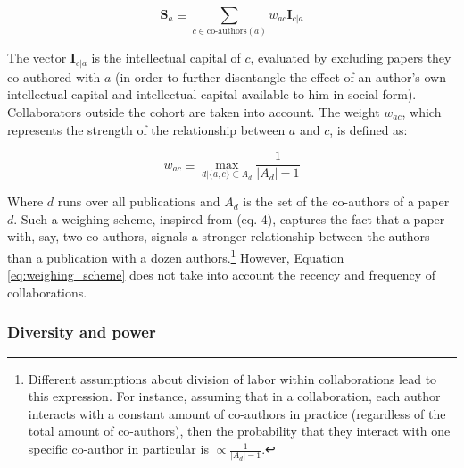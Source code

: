 \documentclass{article}
\begin{document}
\begin{equation}
    \bm{S}_{a} \equiv \sum_{c \in \text{co-authors}(a)} w_{ac} \bm{I}_{c|a}
\end{equation}

The vector $\bm{I}_{c|a}$ is the intellectual capital of $c$, evaluated by excluding papers they co-authored with $a$ (in order to further disentangle the effect of an author's own intellectual capital and intellectual capital available to him in social form). Collaborators outside the cohort are taken into account. The weight $w_{ac}$, which represents the strength of the relationship between $a$ and $c$, is defined as:

\begin{equation}
    w_{ac} \equiv \max_{d|\{a,c\} \subset A_d} \frac{1}{|A_d|-1}
    \label{eq:weighing_scheme}
\end{equation}

Where $d$ runs over all publications and $A_d$ is the set of the co-authors of a paper $d$. Such a weighing scheme, inspired from \citealt{Newman2004} (eq. 4), captures the fact that a paper with, say, two co-authors, signals a stronger relationship between the authors than a publication with a dozen authors.\footnote{Different assumptions about division of labor within collaborations lead to this expression. For instance, assuming that in a collaboration, each author interacts with a constant amount of co-authors in practice (regardless of the total amount of co-authors), then the probability that they interact with one specific co-author in particular is $\propto \frac{1}{|A_d|-1}$. 
} However, Equation \eqref{eq:weighing_scheme} does not take into account the recency and frequency of collaborations.

\subsubsection{Diversity and power}
\end{document}
